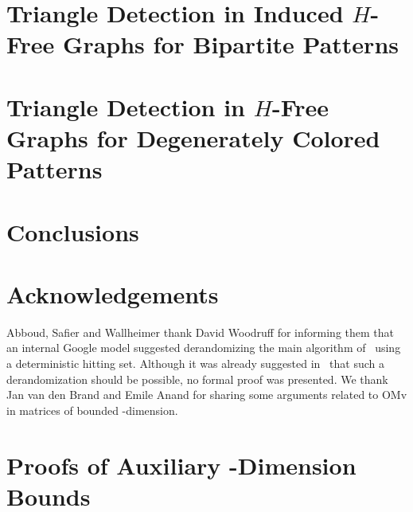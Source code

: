 \documentclass[11pt]{article}
\begin{document}
   \section{Triangle Detection in Induced $H$-Free Graphs for Bipartite Patterns} 
      \label{sec:induced}
      

   \section{Triangle Detection in $H$-Free Graphs for Degenerately Colored Patterns}
      \label{sec:degenerate}
      

   \section{Conclusions}
      \label{sec:conclusions}
      

   \section*{Acknowledgements}
      Abboud, Safier and Wallheimer thank David Woodruff for informing them that an internal Google model suggested derandomizing the main algorithm of~\cite{abboud2026triangle} 
      using a deterministic hitting set. Although it was already suggested in~\cite[Section 11]{abboud2026triangle} that such a 
      derandomization should be possible, no formal proof was presented. 
      We thank Jan van den Brand and Emile Anand for sharing some arguments related to OMv in matrices of bounded \VC-dimension. 

   
   
   \clearpage
   \appendix
   \section{Proofs of Auxiliary \VC-Dimension Bounds}
      \label{app:auxiliary-vc-proofs}
      
\end{document}
